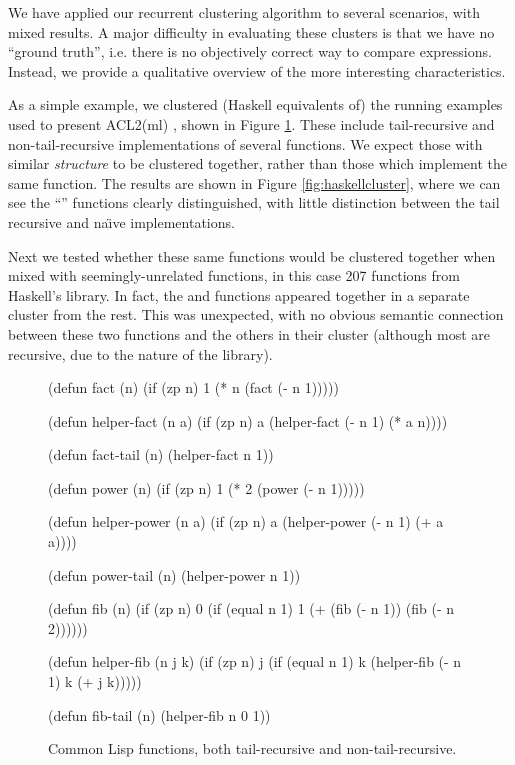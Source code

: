 We have applied our recurrent clustering algorithm to several scenarios, with
mixed results. A major difficulty in evaluating these clusters is that we have
no ``ground truth'', i.e. there is no objectively correct way to compare
expressions. Instead, we provide a qualitative overview of the more interesting
characteristics.

As a simple example, we clustered (Haskell equivalents of) the running examples
used to present ACL2(ml) \cite{heras2013proof}, shown in Figure
\ref{fig:lisp}. These include tail-recursive and non-tail-recursive
implementations of several functions. We expect those with similar
\emph{structure} to be clustered together, rather than those which implement the
same function. The results are shown in Figure \ref{fig:haskellcluster}, where
we can see the ``'' functions clearly distinguished, with little
distinction between the tail recursive and na\"{\i}ve implementations.

Next we tested whether these same functions would be clustered together when
mixed with seemingly-unrelated functions, in this case 207 functions from
Haskell's  library. In fact, the  and 
functions appeared together in a separate cluster from the rest. This was
unexpected, with no obvious semantic connection between these two functions and
the others in their cluster (although most are recursive, due to the nature of
the  library).

\begin{figure}
  \begin{haskell}
(defun fact (n)
  (if (zp n) 1 (* n (fact (- n 1)))))

(defun helper-fact (n a)
  (if (zp n) a (helper-fact (- n 1) (* a n))))

(defun fact-tail (n)
  (helper-fact n 1))

(defun power (n)
  (if (zp n) 1 (* 2 (power (- n 1)))))

(defun helper-power (n a)
  (if (zp n) a (helper-power (- n 1) (+ a a))))

(defun power-tail (n)
  (helper-power n 1))

(defun fib (n)
  (if (zp n)
      0
      (if (equal n 1)
          1
          (+ (fib (- n 1)) (fib (- n 2))))))

(defun helper-fib (n j k)
  (if (zp n)
      j
      (if (equal n 1)
          k
          (helper-fib (- n 1) k (+ j k)))))

(defun fib-tail (n)
  (helper-fib n 0 1))
  \end{haskell}
  \caption{Common Lisp functions, both tail-recursive and non-tail-recursive.}
  \label{fig:lisp}
\end{figure}

